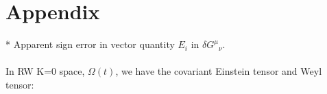 \documentclass[10pt,letterpaper]{article}
\begin{document}
\section*{Appendix}
* Apparent sign error in vector quantity $E_i$ in $\delta G^\mu{}_\nu$. 
\\ \\
In RW K=0 space, $\Omega(t)$, we have the covariant Einstein tensor and Weyl tensor:
\end{document}
